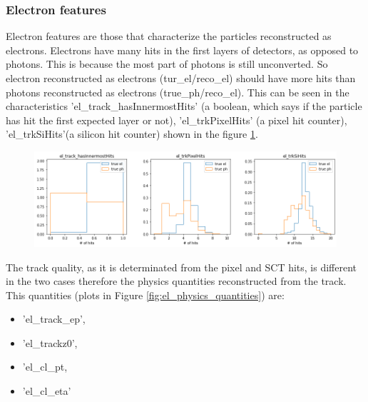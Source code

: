 				\subsubsection{Electron features}
				Electron features are those that characterize the particles reconstructed as electrons. Electrons have many hits in the first layers of detectors, as opposed to photons. This is because the most part of photons is still unconverted. So electron reconstructed as electrons (tur\_el/reco\_el) should have more hits than photons reconstructed as electrons (true\_ph/reco\_el). This can be seen in the characteristics 'el\_track\_hasInnermostHits' (a boolean, which says if the particle has hit the first expected layer or not), 'el\_trkPixelHits' (a pixel hit counter), 'el\_trkSiHits'(a silicon hit counter) shown in the figure \ref{fig:el_hit}.
				\begin{figure}
					\centering
					\includegraphics[width=0.7\textheight]{tesi_images/el_hit.png}
					\caption{}
					\label{fig:el_hit}
				\end{figure}
				
				The track quality, as it is determinated from the pixel and SCT hits, is different in the two cases therefore the physics quantities reconstructed from the track. This quantities (plots in Figure \ref{fig:el_physics_quantities}) are:
				\begin{itemize}
					\item 'el\_track\_ep',
					\item 'el\_trackz0',
					\item 'el\_cl\_pt, 
					\item 'el\_cl\_eta'
				\end{itemize}
			

